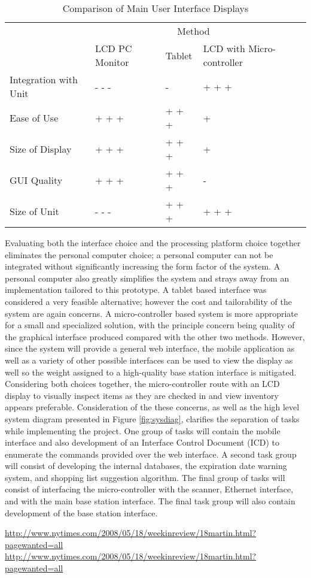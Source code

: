 \documentclass[11pt,letterpaper]{article}
\begin{document}
\begin{table}[h!]
\begin{tabular}{| p{2in} | p{1in} | p{1.5in} | p{1.5in} | p{1.5in} |}
\cline{2-4}
\multicolumn{1}{c}{}&\multicolumn{3}{|c|}{Method} \\
\cline{2-4}
\multicolumn{1}{c|}{}&LCD PC Monitor&Tablet&LCD with Micro-controller\\
\hline
Integration with Unit&- - -&-&+ + +\\
\hline
Ease of Use&+ + +&+ + +&+\\
\hline
Size of Display& + + + &+ + +&+\\
\hline
GUI Quality&+ + +&+ + +&-\\
\hline
Size of Unit&- - -&+ + +&+ + +\\
\hline
\end{tabular}
\caption{Comparison of Main User Interface Displays}
\label{tab:disp}
\end{table}
\noindent Evaluating both the interface choice and the processing platform choice together eliminates the personal computer choice; a personal computer can not be integrated without significantly increasing the form factor of the system. A personal computer also greatly simplifies the system and strays away from an implementation tailored to this prototype. A tablet based interface was considered a very feasible alternative; however the cost and tailorability of the system are again concerns. A micro-controller based system is more appropriate for a small and specialized solution, with the principle concern being quality of the graphical interface produced compared with the other two methods. However, since the system will provide a general web interface, the mobile application as well as a variety of other possible interfaces can be used to view the display as well so the weight assigned to a high-quality base station interface is mitigated. Considering both choices together, the micro-controller route with an LCD display to visually inspect items as they are checked in and view inventory appears preferable.
\newline \quad \newline
Consideration of the these concerns, as well as the high level system diagram presented in Figure \ref{fig:sysdiag}, clarifies the separation of tasks while implementing the project. One group of tasks will contain the mobile interface and also development of an Interface Control Document (ICD) to enumerate the commands provided over the web interface. A second task group will consist of developing the internal databases, the expiration date warning system, and shopping list suggestion algorithm. The final group of tasks will consist of interfacing the micro-controller with the scanner, Ethernet interface, and with the main base station interface. The final task group will also contain development of the base station interface.



\begin{thebibliography}{9}
\url{http://www.nytimes.com/2008/05/18/weekinreview/18martin.html?pagewanted=all}
\url{http://www.nytimes.com/2008/05/18/weekinreview/18martin.html?pagewanted=all}
 \end{thebibliography}
\end{document}
